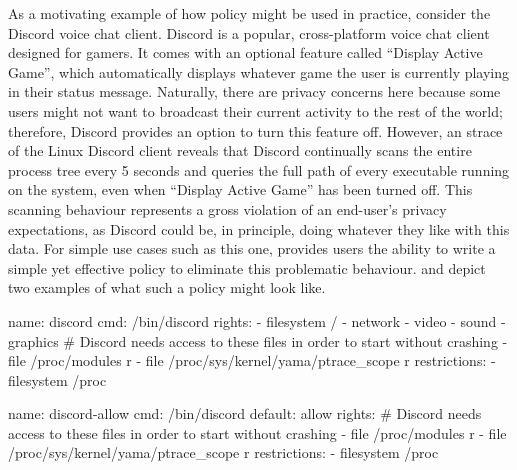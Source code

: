 As a motivating example of how \bpfcontain{} policy might be used in practice, consider the Discord voice chat client. Discord \cite{discord} is a popular, cross-platform voice chat client designed for gamers. It comes with an optional feature called \enquote{Display Active Game}, which automatically displays whatever game the user is currently playing in their status message. Naturally, there are privacy concerns here because some users might not want to broadcast their current activity to the rest of the world; therefore, Discord provides an option to turn this feature off. However, an strace \cite{strace} of the Linux Discord client reveals that Discord continually scans the entire process tree every 5 seconds and queries the full path of every executable running on the system, even when \enquote{Display Active Game} has been turned off. This scanning behaviour represents a gross violation of an end-user's privacy expectations\footnotemark{}, as Discord could be, in principle, doing whatever they like with this data. For simple use cases such as this one, \bpfcontain{} provides users the ability to write a simple yet effective policy to eliminate this problematic behaviour.  and  depict two examples of what such a policy might look like.

\begin{listing}[
  language=yaml,
  caption={
    A sample manifest for Discord \cite{discord} using \bpfcontain{}'s more
    restrictive default-deny confinement. All accesses which are not listed
    under the container's rights are implictly denied. The explicit restriction
    on access to \texttt{procfs} prevents Discord from scanning the process
    tree, regardless of its rights.
  },
  label={lst:discord_a},
  gobble=2]
  name: discord
  cmd: /bin/discord
  rights:
    - filesystem /
    - network
    - video
    - sound
    - graphics
    # Discord needs access to these files in order to start without crashing
    - file /proc/modules r
    - file /proc/sys/kernel/yama/ptrace_scope r
  restrictions:
    - filesystem /proc
\end{listing}

\begin{listing}[
  language=yaml,
  caption={
    A sample manifest for Discord \cite{discord} using \bpfcontain{}'s optional
    default-allow confinement.  This permits a much simpler policy that directly
    targets Discord's \texttt{procfs} scanning behaviour.
  },
  label={lst:discord_b},
  gobble=2]
  name: discord-allow
  cmd: /bin/discord
  default: allow
  rights:
    # Discord needs access to these files in order to start without crashing
    - file /proc/modules r
    - file /proc/sys/kernel/yama/ptrace_scope r
  restrictions:
    - filesystem /proc
\end{listing}

